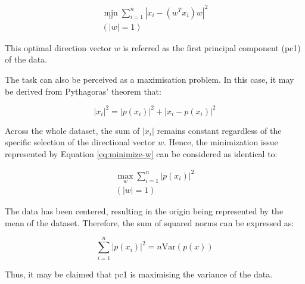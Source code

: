 \begin{equation}
	\begin{split}
		\min_{w}\sum_{i=1}^{n}|x_{i}-(w^{T}x_{i})w|^{2} \\
		(|w|=1)
		\label{eq:minimize-w}
	\end{split}
\end{equation}

This optimal direction vector $w$ is referred as the first principal component (\gls{pc1}) of the data.

The task can also be perceived as a maximisation problem. In this case, it may be derived from Pythagoras' theorem that:

\begin{equation}
	|x_{i}|^{2}=|p(x_{i})|^{2}+|x_{i}-p(x_{i})|^{2}
	\label{eq:max-w-pythagoras}
\end{equation}

Across the whole dataset, the sum of $|x_{i}|$ remains constant regardless of the specific selection of the directional vector $w$. Hence, the minimization issue represented by Equation \ref{eq:minimize-w} can be considered as identical to:


\begin{equation}
	\begin{split}
		\max_{w}\sum_{i=1}^{n}|p(x_{i})|^{2} \\
		(|w|=1)
		\label{eq:max-w}
	\end{split}	
\end{equation}

The data has been centered, resulting in the origin being represented by the mean of the dataset. Therefore, the sum of squared norms can be expressed as:

\begin{equation}
	\sum_{i=1}^{n}|p(x_{i})|^{2}=n\text{Var}(p(x))
	\label{eq:pca-var}
\end{equation}

Thus, it may be claimed that \gls{pc1} is maximising the variance of the data.



